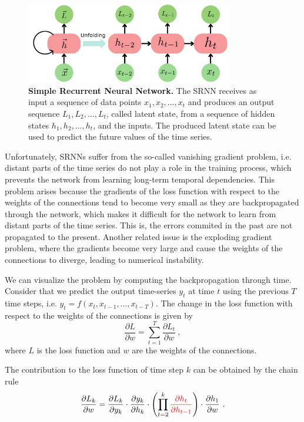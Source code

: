 \begin{figure}[H]
  \centering
  \includegraphics[width=0.8\textwidth]{Figures/RNN.pdf}
  \caption[Simple Recurrent Neural Network]{
    \textbf{Simple Recurrent Neural Network.} The SRNN receives as input a
    sequence of data points $x_1, x_2, \ldots, x_t$ and produces an output
    sequence $L_1, L_2, \ldots, L_t$, called latent state, from a sequence of
    hidden states $h_1, h_2, \ldots, h_t$, and the inputs. The produced latent
    state can be used to predict the future values of the time series.}
  \label{fig:SRNN_scheme}
\end{figure}

Unfortunately, SRNNs suffer from the so-called vanishing gradient problem, i.e.
distant parts of the time series do not play a role in the training process,
which prevents the network from learning long-term temporal dependencies. This
problem arises because the gradients of the loss function with respect to the
weights of the connections tend to become very small as they are backpropagated
through the network, which makes it difficult for the network to learn from
distant parts of the time series. This is, the errors commited in the past are
not propagated to the present. Another related issue is the exploding gradient
problem, where the gradients become very large and cause the weights of the
connections to diverge, leading to numerical instability.

We can visualize the problem by computing the backpropagation through time.
Consider that we predict the output time-series $y_t$ at time $t$ using the
previous $T$ time steps, i.e. $y_t = f(x_t, x_{t-1}, \ldots, x_{t-T})$. The
change in the loss function with respect to the weights of the connections is
given by
\begin{equation}\label{eq:loss_RNN}
  \frac{\partial L}{\partial w} = \sum_{t=1}^{T} \frac{\partial L_t}{\partial
    w} \ ,
\end{equation}
where $L$ is the loss function and $w$ are the weights of the connections.

The contribution to the loss function of time step $k$ can be obtained by the
chain rule
\begin{equation}
  \frac{\partial L_k}{\partial w} = \frac{\partial L_k}{\partial
    y_k}\cdot\frac{\partial y_k}{\partial
    h_k}\cdot\left(\prod_{t=2}^k\textcolor{red}{\frac{\partial
      h_t}{\partial h_{t-1}}}\right)\cdot\frac{\partial h_1}{\partial w} \ .
\end{equation}

